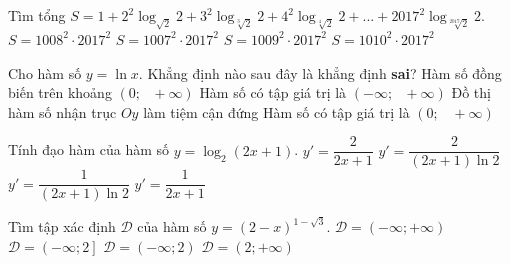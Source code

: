 \begin{ex}%
	Tìm tổng  $S = 1 + 2^2 \log_{\sqrt{2}}2 + 3^2\log _{\sqrt[3]{2}}2 + 4^2 \log_{\sqrt[4]{2}}2 +... + 2017^2\log _{\sqrt[2017]{2}}2$. 
	\choice
	{ $S = 1008^2\cdot2017^2$ }
	{ $S = 1007^2\cdot2017^2$ }
	{\True  $S = 1009^2\cdot2017^2$ }
	{ $S = 1010^2\cdot2017^2$ }
\end{ex}

\begin{ex}%
	Cho hàm số  $y = \ln x$. Khẳng định nào sau đây là khẳng định \textbf{sai}?
	\choice
	{Hàm số đồng biến trên khoảng  $\left( 0;\text{ } + \infty  \right)$}
	{Hàm số có tập giá trị là  $\left(-\infty;\text{ } + \infty \right)$}
	{Đồ thị hàm số nhận trục $Oy$ làm tiệm cận đứng}
	{\True Hàm số có tập giá trị là $\left( 0;\,\text{ } + \infty \right)$} 
\end{ex}

\begin{ex}%
	Tính đạo hàm của hàm số  $y = \log _2\left(2x + 1\right)$. 
	\choice
	{$y' = \dfrac{2}{2x + 1}$}
	{\True  $y' = \dfrac{2}{\left(2x + 1 \right)\ln 2}$ }
	{$y' = \dfrac{1}{\left(2x + 1\right)\ln 2}$}
	{$y' = \dfrac{1}{2x + 1}$}
\end{ex}

\begin{ex}%
	Tìm tập xác định  $\mathscr{D}$  của hàm số  $y = (2-x)^{1- \sqrt{3}}$. 
	\choice
	{ $\mathscr{D} = \left(- \infty; + \infty \right)$ }
	{ $\mathscr{D} = \left(- \infty;2 \right]$ }
	{\True  $\mathscr{D} = \left(- \infty;2 \right)$ }
	{ $\mathscr{D} = \left(2; + \infty \right)$}
\end{ex}

